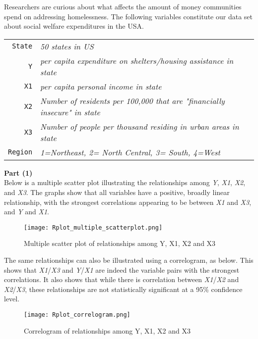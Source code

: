 \documentclass[12pt,letterpaper]{article}
\begin{document}
\noindent Researchers are curious about what affects the amount of money communities spend on addressing homelessness. The following variables constitute our data set about social welfare expenditures in the USA. \\
\vspace{.5cm}


\begin{tabular}{r|l}
	\texttt{State} &\emph{50 states in US} \\
	\texttt{Y} & \emph{per capita expenditure on shelters/housing assistance in state}\\
	\texttt{X1} &\emph{per capita personal income in state} \\
	\texttt{X2} &  \emph{Number of residents per 100,000 that are "financially insecure" in state}\\
	\texttt{X3} &  \emph{Number of people per thousand residing in urban areas in state} \\
	\texttt{Region} &  \emph{1=Northeast, 2= North Central, 3= South, 4=West} \\
\end{tabular}

\vspace{1cm}

\noindent \textbf{Part (1)}\\

Below is a multiple scatter plot illustrating the relationships among \emph{Y}, \emph{X1}, \emph{X2}, and \emph{X3}. The graphs show that all variables have a positive, broadly linear relationship, with the strongest correlations appearing to be between \emph{X1} and \emph{X3}, and \emph{Y} and \emph{X1}.\\

\begin{figure}[H]\centering
	\caption{\footnotesize Multiple scatter plot of relationships among Y, X1, X2 and X3}
	\texttt{[image: Rplot\_multiple\_scatterplot.png]}
\end{figure} 

The same relationships can also be illustrated using a correlogram, as below. This shows that \emph{X1}/\emph{X3} and \emph{Y}/\emph{X1} are indeed the variable pairs with the strongest correlations. It also shows that while there is correlation between \emph{X1}/\emph{X2} and \emph{X2}/\emph{X3}, these relationships are not statistically significant at a 95\% confidence level.\\

\begin{figure}[H]\centering
	\caption{\footnotesize Correlogram of relationships among Y, X1, X2 and X3}
	\texttt{[image: Rplot\_correlogram.png]}
\end{figure} 
\end{document}
